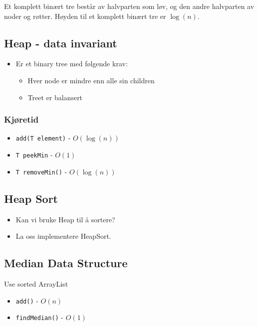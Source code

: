 \documentclass{article}
\begin{document}
    Et komplett binært tre består av halvparten som løv, og den andre halvparten av noder og røtter. Høyden til et komplett binært tre er \( \log\left( n \right) \).

    \subsection{Heap - data invariant}
    \begin{itemize}
        \item Er et binary tree med følgende krav:
            \begin{itemize}
                \item Hver node er mindre enn alle sin children
                \item Treet er balansert
            \end{itemize}
    \end{itemize}


    \subsubsection{Kjøretid}

    \begin{itemize}
        \item \texttt{add(T element)} - \( O\left( \log\left( n \right) \right) \)
        \item \texttt{T peekMin} - \( O\left( 1 \right) \)
        \item \texttt{T removeMin()} - \( O\left( \log\left( n \right) \right) \)
    \end{itemize}

    \subsection{Heap Sort}
    \begin{itemize}
        \item Kan vi bruke Heap til å sortere?
        \item La oss implementere HeapSort.
    \end{itemize}

    \subsection{Median Data Structure}
    Use sorted ArrayList

    \begin{itemize}
        \item \texttt{add()} - \( O\left( n \right) \)
        \item \texttt{findMedian()} - \( O\left( 1 \right) \)
    \end{itemize}
\end{document}
